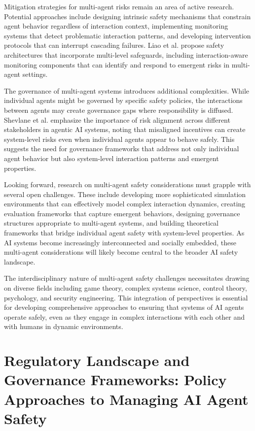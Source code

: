 \documentclass[conference]{IEEEtran}
\begin{document}
Mitigation strategies for multi-agent risks remain an area of active research. Potential approaches include designing intrinsic safety mechanisms that constrain agent behavior regardless of interaction context, implementing monitoring systems that detect problematic interaction patterns, and developing intervention protocols that can interrupt cascading failures. Liao et al. \cite{2409.03793} propose safety architectures that incorporate multi-level safeguards, including interaction-aware monitoring components that can identify and respond to emergent risks in multi-agent settings.

The governance of multi-agent systems introduces additional complexities. While individual agents might be governed by specific safety policies, the interactions between agents may create governance gaps where responsibility is diffused. Shevlane et al. \cite{2410.01927} emphasize the importance of risk alignment across different stakeholders in agentic AI systems, noting that misaligned incentives can create system-level risks even when individual agents appear to behave safely. This suggests the need for governance frameworks that address not only individual agent behavior but also system-level interaction patterns and emergent properties.

Looking forward, research on multi-agent safety considerations must grapple with several open challenges. These include developing more sophisticated simulation environments that can effectively model complex interaction dynamics, creating evaluation frameworks that capture emergent behaviors, designing governance structures appropriate to multi-agent systems, and building theoretical frameworks that bridge individual agent safety with system-level properties. As AI systems become increasingly interconnected and socially embedded, these multi-agent considerations will likely become central to the broader AI safety landscape.

The interdisciplinary nature of multi-agent safety challenges necessitates drawing on diverse fields including game theory, complex systems science, control theory, psychology, and security engineering. This integration of perspectives is essential for developing comprehensive approaches to ensuring that systems of AI agents operate safely, even as they engage in complex interactions with each other and with humans in dynamic environments.



\section{Regulatory Landscape and Governance Frameworks: Policy Approaches to Managing AI Agent Safety}
\end{document}
